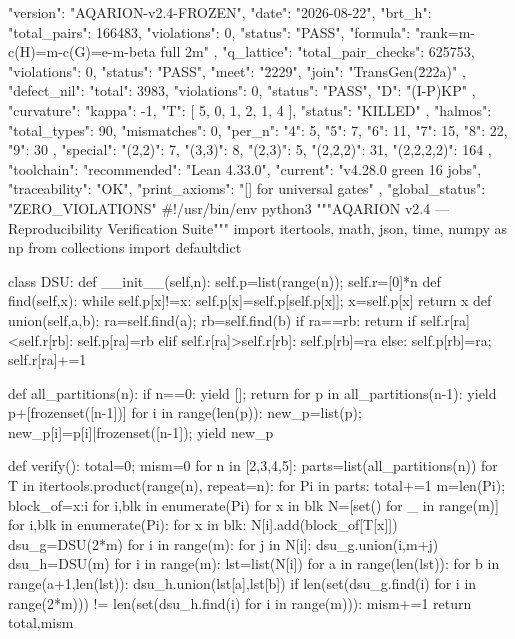 {
  "version": "AQARION-v2.4-FROZEN",
  "date": "2026-08-22",
  "brt_h": {
    "total_pairs": 166483,
    "violations": 0,
    "status": "PASS",
    "formula": "rank=m-c(H)=m-c(G)=e-m-beta full 2m"
  },
  "q_lattice": {
    "total_pair_checks": 625753,
    "violations": 0,
    "status": "PASS",
    "meet": "\u2229",
    "join": "TransGen(\u222a)"
  },
  "defect_nil": {
    "total": 3983,
    "violations": 0,
    "status": "PASS",
    "D": "(I-P)KP"
  },
  "curvature": {
    "kappa": -1,
    "T": [
      5,
      0,
      1,
      2,
      1,
      4
    ],
    "status": "KILLED"
  },
  "halmos": {
    "total_types": 90,
    "mismatches": 0,
    "per_n": {
      "4": 5,
      "5": 7,
      "6": 11,
      "7": 15,
      "8": 22,
      "9": 30
    },
    "special": {
      "(2,2)": 7,
      "(3,3)": 8,
      "(2,3)": 5,
      "(2,2,2)": 31,
      "(2,2,2,2)": 164
    }
  },
  "toolchain": {
    "recommended": "Lean 4.33.0",
    "current": "v4.28.0 green 16 jobs",
    "traceability": "OK",
    "print_axioms": "[] for universal gates"
  },
  "global_status": "ZERO_VIOLATIONS"
}
#!/usr/bin/env python3
"""AQARION v2.4 — Reproducibility Verification Suite"""
import itertools, math, json, time, numpy as np
from collections import defaultdict

class DSU:
    def __init__(self,n): self.p=list(range(n)); self.r=[0]*n
    def find(self,x):
        while self.p[x]!=x: self.p[x]=self.p[self.p[x]]; x=self.p[x]
        return x
    def union(self,a,b):
        ra=self.find(a); rb=self.find(b)
        if ra==rb: return
        if self.r[ra]<self.r[rb]: self.p[ra]=rb
        elif self.r[ra]>self.r[rb]: self.p[rb]=ra
        else: self.p[rb]=ra; self.r[ra]+=1

def all_partitions(n):
    if n==0: yield []; return
    for p in all_partitions(n-1):
        yield p+[frozenset([n-1])]
        for i in range(len(p)):
            new_p=list(p); new_p[i]=p[i]|frozenset([n-1]); yield new_p

def verify():
    total=0; mism=0
    for n in [2,3,4,5]:
        parts=list(all_partitions(n))
        for T in itertools.product(range(n), repeat=n):
            for Pi in parts:
                total+=1
                m=len(Pi); block_of={x:i for i,blk in enumerate(Pi) for x in blk}
                N=[set() for _ in range(m)]
                for i,blk in enumerate(Pi):
                    for x in blk: N[i].add(block_of[T[x]])
                dsu_g=DSU(2*m)
                for i in range(m):
                    for j in N[i]: dsu_g.union(i,m+j)
                dsu_h=DSU(m)
                for i in range(m):
                    lst=list(N[i])
                    for a in range(len(lst)):
                        for b in range(a+1,len(lst)): dsu_h.union(lst[a],lst[b])
                if len(set(dsu_g.find(i) for i in range(2*m))) != len(set(dsu_h.find(i) for i in range(m))):
                    mism+=1
    return total,mism

